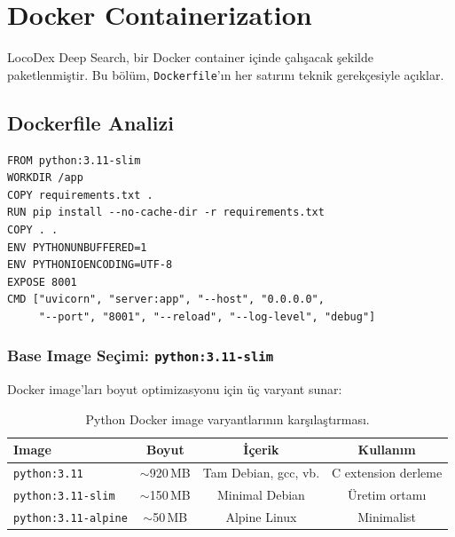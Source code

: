 

\section{Docker Containerization}
\label{sec:deploy-docker}

LocoDex Deep Search, bir Docker container i\c{c}inde \c{c}al{\i}\c{s}acak \c{s}ekilde paketlenmi\c{s}tir. Bu b\"{o}l\"{u}m, \texttt{Dockerfile}'{\i}n her sat{\i}r{\i}n{\i} teknik gerek\c{c}esiyle a\c{c}{\i}klar.

\subsection{Dockerfile Analizi}

\begin{verbatim}
FROM python:3.11-slim
WORKDIR /app
COPY requirements.txt .
RUN pip install --no-cache-dir -r requirements.txt
COPY . .
ENV PYTHONUNBUFFERED=1
ENV PYTHONIOENCODING=UTF-8
EXPOSE 8001
CMD ["uvicorn", "server:app", "--host", "0.0.0.0",
     "--port", "8001", "--reload", "--log-level", "debug"]
\end{verbatim}

\subsubsection{Base Image Se\c{c}imi: \texttt{python:3.11-slim}}

Docker image'lar{\i} boyut optimizasyonu i\c{c}in \"{u}\c{c} varyant sunar:

\begin{table}[H]
\centering
\caption{Python Docker image varyantlar{\i}n{\i}n kar\c{s}{\i}la\c{s}t{\i}rmas{\i}.}
\label{tab:docker-images}
\begin{tabular}{lccc}
\toprule
\textbf{Image} & \textbf{Boyut} & \textbf{\.{I}\c{c}erik} & \textbf{Kullan{\i}m} \\
\midrule
\texttt{python:3.11} & $\sim$920\,MB & Tam Debian, gcc, vb. & C extension derleme \\
\texttt{python:3.11-slim} & $\sim$150\,MB & Minimal Debian & \"{U}retim ortam{\i} \\
\texttt{python:3.11-alpine} & $\sim$50\,MB & Alpine Linux & Minimalist \\
\bottomrule
\end{tabular}
\end{table}

